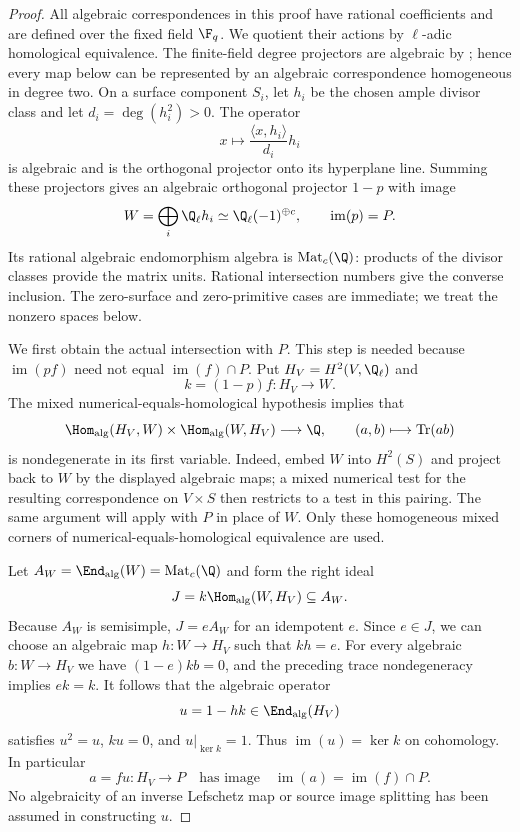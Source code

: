 \begin{proof}
All algebraic correspondences in this proof have rational coefficients
and are defined over the fixed field $\F_q$. We quotient their actions
by $\ell$-adic homological equivalence. The finite-field degree
projectors are algebraic by
\citet[Theorem~2(1), pp.~76--77]{c_katzmessing1974}; hence every map
below can be represented by an algebraic correspondence homogeneous
in degree two. On a surface component $S_i$, let $h_i$ be the chosen
ample divisor class and let $d_i=\deg(h_i^2)>0$. The operator
\[
 x\longmapsto \frac{\langle x,h_i\rangle}{d_i}h_i
\]
is algebraic and is the orthogonal projector onto its hyperplane line.
Summing these projectors gives an algebraic orthogonal projector
$1-p$ with image
\[
 W=\bigoplus_i\Q_\ell h_i\simeq\Q_\ell(-1)^{\oplus c},
 \qquad\operatorname{im}(p)=P.
\]
Its rational algebraic endomorphism algebra is
$\operatorname{Mat}_c(\Q)$: products of the divisor classes provide
the matrix units. Rational intersection numbers give the converse
inclusion. The zero-surface and zero-primitive cases are immediate;
we treat the nonzero spaces below.

We first obtain the actual intersection with $P$. This step is needed
because $\operatorname{im}(pf)$ need not equal
$\operatorname{im}(f)\cap P$. Put $H_V=H^2(V,\Q_\ell)$ and
\[
 k=(1-p)f:H_V\longrightarrow W.
\]
The mixed numerical-equals-homological hypothesis implies that
\[
 \Hom_{\rm alg}(H_V,W)\times\Hom_{\rm alg}(W,H_V)
 \longrightarrow\Q,\qquad (a,b)\longmapsto\operatorname{Tr}(ab)
\]
is nondegenerate in its first variable. Indeed, embed $W$ into $H^2(S)$
and project back to $W$ by the displayed algebraic maps; a mixed
numerical test for the resulting correspondence on $V\times S$
then restricts to a test in this pairing. The same argument will
apply with $P$ in place of $W$. Only these homogeneous mixed corners
of numerical-equals-homological equivalence are used.

Let $A_W=\End_{\rm alg}(W)=\operatorname{Mat}_c(\Q)$ and form the
right ideal
\[
 J=k\Hom_{\rm alg}(W,H_V)\subseteq A_W.
\]
Because $A_W$ is semisimple, $J=eA_W$ for an idempotent $e$. Since
$e\in J$, we can choose an algebraic map $h:W\to H_V$ such that
$kh=e$. For every algebraic $b:W\to H_V$ we have
$(1-e)kb=0$, and the preceding trace nondegeneracy implies $ek=k$.
It follows that the algebraic operator
\[
 u=1-hk\in\End_{\rm alg}(H_V)
\]
satisfies $u^2=u$, $ku=0$, and $u|_{\ker k}=1$. Thus
$\operatorname{im}(u)=\ker k$ on cohomology. In particular
\[
 a=fu:H_V\longrightarrow P
 \quad\text{has image}\quad
 \operatorname{im}(a)=\operatorname{im}(f)\cap P.
\]
No algebraicity of an inverse Lefschetz map or source image splitting
has been assumed in constructing $u$.


\end{proof}
